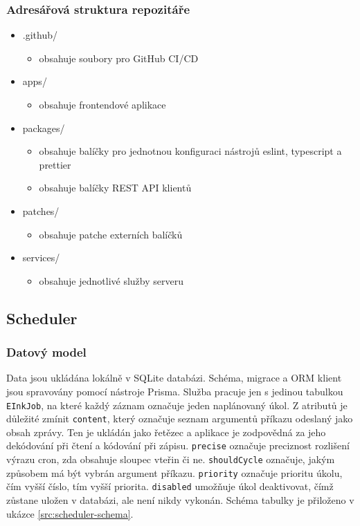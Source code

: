 \subsubsection{Adresářová struktura repozitáře}
\begin{itemize}
    \item .github/
        \begin{itemize}
            \item obsahuje soubory pro GitHub CI/CD
        \end{itemize}
    \item apps/
        \begin{itemize}
            \item obsahuje frontendové aplikace
        \end{itemize}
    \item packages/
        \begin{itemize}
            \item obsahuje balíčky pro jednotnou konfiguraci nástrojů eslint, typescript a prettier
            \item obsahuje balíčky REST API klientů
        \end{itemize}
    \item patches/
        \begin{itemize}
            \item obsahuje patche externích balíčků
        \end{itemize}
    \item services/
        \begin{itemize}
            \item obsahuje jednotlivé služby serveru
        \end{itemize}
\end{itemize}

\subsection{Scheduler}
\subsubsection{Datový model}
Data jsou ukládána lokálně v SQLite databázi. Schéma, migrace a ORM klient jsou spravovány pomocí nástroje Prisma. Služba pracuje jen s jedinou tabulkou \lstinline|EInkJob|, na které každý záznam označuje jeden naplánovaný úkol. Z atributů je důležité zmínit \lstinline|content|, který označuje seznam argumentů příkazu odeslaný jako obsah zprávy. Ten je ukládán jako řetězec a aplikace je zodpovědná za jeho dekódování při čtení a kódování při zápisu. \lstinline|precise| označuje preciznost rozlišení výrazu cron, zda obsahuje sloupec vteřin či ne. \lstinline|shouldCycle| označuje, jakým způsobem má být vybrán argument příkazu. \lstinline|priority| označuje prioritu úkolu, čím vyšší číslo, tím vyšší priorita. \lstinline|disabled| umožňuje úkol deaktivovat, čímž zůstane uložen v databázi, ale není nikdy vykonán. Schéma tabulky je přiloženo v ukázce \ref{src:scheduler-schema}.

